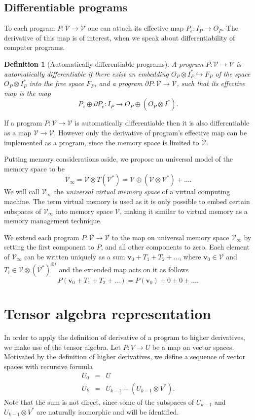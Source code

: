 \documentclass{article}
\newcommand{\VV}{\mathcal{V}}
\newcommand{\vv}{\mathbf{v}}
\newcommand{\D}{\partial}
\newtheorem{definicija}{Definition}[section]
\begin{document}
\subsection{Differentiable programs}
To each program $P:\VV\to \VV$ one can attach its effective map $P_e:I_P\to
O_P$. The derivative of this map is of interest, when we speak about
differentiability of computer programs. 
\begin{definicija}[Automatically differentiable programs]
  A program $P:\VV\to \VV$ is \emph{automatically differentiable} if there exist an embedding
  $O_P\otimes I_P^*\hookrightarrow F_P$ of the space $O_P\otimes I_P^*$ into
  the free space $F_P$, and a program $\D P:\VV\to \VV$, such that its effective
  map is the map
  \begin{equation}
    \label{eq:program_derivative}
    P_e\oplus \D P_e:I_P\rightarrow O_P\oplus (O_P\otimes I^*).
  \end{equation}
\end{definicija}

If a program $P:\VV\to \VV$ is automatically differentiable then it is also
differentiable as a map $\VV\to\VV$. However only the derivative of program's
effective map can be implemented as a program, since the memory space is limited to $\VV$. 

Putting memory considerations aside, we propose an universal model of the memory
space to be 
$$\VV_\infty = \VV\otimes T(\VV^*) = \VV\oplus
(\VV\otimes\VV^*)+\ldots.$$
We will call $\VV_\infty$ the \emph{universal virtual memory space} of a virtual computing machine. The term virtual memory is used as it is
only possible to embed certain subspaces of $\VV_\infty$ into memory space $\VV$, making it similar to
virtual memory as a memory management technique.  

We extend each program $P:\VV\to \VV$ to the map on universal memory space $\VV_\infty$ by setting the first component to $P$,
and all other components to zero. Each element of $\VV_\infty$ can be written
uniquely as a sum $\vv_0+T_1+T_2+\ldots$, where $\vv_0\in\VV$ and 
$T_i\in\VV\otimes (\VV^*)^{\otimes i}$ and the extended map acts on it as follows   
\begin{equation}
  \label{eq:extension}
  P(\vv_0+T_1+T_2+\ldots)=P(\vv_0)+0+0+\ldots.
\end{equation}

\section{Tensor algebra representation}
In order to apply the definition of derivative of a program to higher
derivatives, we make use of the tensor algebra.
Let $P:V\to U$ be a map on vector spaces. Motivated by the definition of higher
derivatives, we define a sequence of vector spaces with
recursive formula
\begin{eqnarray}
  \label{eq:universal_space}
  U_0 &=& U\\
  U_k &=& U_{k-1}+\left(U_{k-1}\otimes V^*\right).
\end{eqnarray}
Note that the sum is not direct, since some of the subspaces of $U_{k-1}$ and
$U_{k-1}\otimes V^*$ are naturally isomorphic and will be identified.
\end{document}
